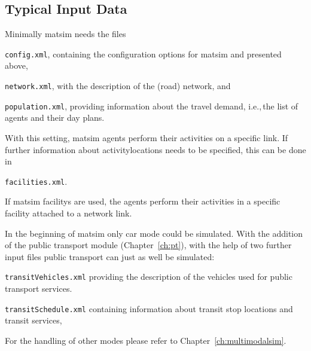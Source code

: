 \subsection{Typical Input Data}
\label{sec:inputdata}
Minimally \gls{matsim} needs the files
\begin{compactitem}
	\item \lstinline|config.xml|, containing the configuration options for \gls{matsim} and presented above,
	\item \lstinline|network.xml|, with the description of the (road) network, and
	\item \lstinline|population.xml|, providing information about	the travel demand, i.e.,\,the list of agents and their day plans.
\end{compactitem}


With this setting, \gls{matsim} agents perform their activities on a specific \gls{link}. If further information about \glspl{activitylocation} needs to be specified, this can be done in 
\begin{compactitem}
\item \lstinline|facilities.xml|. 
\end{compactitem}
%
If \gls{matsim} \glspl{facility} are used, the agents perform their activities in a specific \gls{facility} attached to a network link.

In the beginning of \gls{matsim} only car mode could be simulated. With the addition of the public transport \gls{module} (Chapter~\ref{ch:pt}), with the help of two further input files public transport can just as well be simulated:
\begin{compactitem}
\item \lstinline|transitVehicles.xml| providing the description of the vehicles used for public transport services. 
\item \lstinline|transitSchedule.xml| containing information about transit stop locations and transit services,
\end{compactitem}
%
For the handling of other modes please refer to Chapter~\ref{ch:multimodalsim}.

